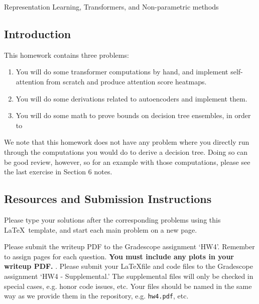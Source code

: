 \documentclass[submit]{../harvardml}
\begin{document}
\begin{center}
{\Large Representation Learning, Transformers, and Non-parametric methods}\\
\end{center}

\subsection*{Introduction}

This homework contains three problems:
\begin{enumerate}
    \item You will do some transformer computations by hand, and implement self-attention from scratch and produce attention score heatmaps.
    \item You will do some derivations related to autoencoders and implement them.
    \item You will do some math to prove bounds on decision tree ensembles, in order to 
\end{enumerate}

We note that this homework does not have any problem where you directly run through the computations you would do to derive a decision tree. Doing so can be good review, however, so for an example with those computations, please see the last exercise in Section 6 notes.

\subsection*{Resources and Submission Instructions}

Please type your solutions after the corresponding problems using this \LaTeX\ template, and start each main problem on a new page.

Please submit the writeup PDF to the Gradescope assignment `HW4'. Remember to assign pages for each question.  \textbf{You must include any plots in your writeup PDF. }. Please submit your \LaTeX file and code files to the Gradescope assignment `HW4 - Supplemental.' The supplemental files will only be checked in special cases, e.g. honor code issues, etc. Your files should be named in the same way as we provide them in the repository, e.g. \texttt{hw4.pdf}, etc.




\newpage

\end{document}
